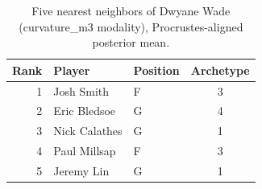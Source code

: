 \begin{table}[htbp]
  \centering\small
  \begin{tabular}{rllc}
    \toprule
    Rank & Player & Position & Archetype \\
    \midrule
    1 & Josh Smith & F & 3 \\
    2 & Eric Bledsoe & G & 4 \\
    3 & Nick Calathes & G & 1 \\
    4 & Paul Millsap & F & 3 \\
    5 & Jeremy Lin & G & 1 \\
    \bottomrule
  \end{tabular}
  \caption{Five nearest neighbors of Dwyane Wade (curvature_m3 modality), Procrustes-aligned posterior mean.}
  \label{tab:Dwyane_Wade_neighbors_curvature_m3}
\end{table}

